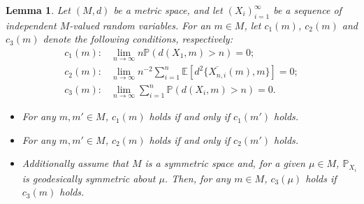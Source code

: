 \documentclass[10pt,a4paper]{amsart}
\newtheorem{lemma}{Lemma}
\begin{document}
\begin{lemma}\label{lem:somevsall_tail_conditions} 
Let $(M,d)$ be a metric space, and let $(X_i)_{i=1}^\infty$ be a sequence of independent $M$-valued random variables. For an $m \in M$, let $c_1(m)$, $c_2(m)$ and $c_3(m)$ denote the following conditions, respectively: 
\begin{align*}
   c_1(m): & \lim_{n\to\infty} n\mathbb{P}(d(X_1,m) > n) = 0;\\
   c_2(m): & \lim_{n\to\infty} n^{-2}\sum_{i=1}^n\mathbb{E}[d^2\{\overline{X_{n,i}}(m),m\}] = 0;\\
   c_3(m): & \lim_{n\to\infty} \sum_{i=1}^n\mathbb{P}(d(X_i,m) > n) = 0.
\end{align*}
\begin{itemize}
    \item[(i)] For any $m,m' \in M$, $c_1(m)$ holds if and only if $c_1(m')$ holds.
    \item[(ii)] For any $m,m' \in M$, $c_2(m)$ holds if and only if $c_2(m')$ holds.
    \item[(iii)] Additionally assume that $M$ is a symmetric space and,  for a given $\mu \in M$, $\mathbb{P}_{X_i}$ is geodesically symmetric about $\mu$. Then, for any $m \in M$, $c_3(\mu)$ holds if $c_3(m)$ holds.
\end{itemize}
\end{lemma}
\end{document}
